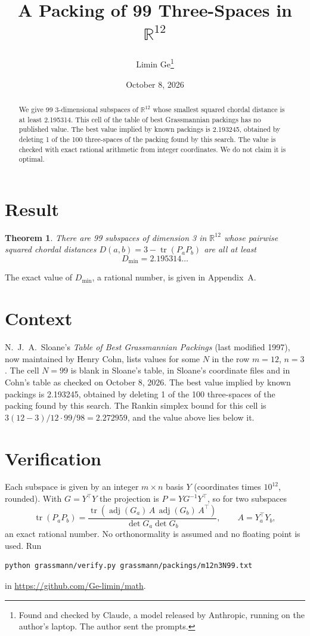 \documentclass[11pt,a4paper]{article}
\title{A Packing of 99 Three-Spaces in $\mathbb{R}^{12}$}
\author{Limin Ge\thanks{Found and checked by Claude, a model released by Anthropic, running on the author's laptop. The author sent the prompts.}}
\date{October 8, 2026}
\newtheorem*{theorem}{Theorem}
\begin{document}
\maketitle
\begin{abstract}
We give 99 3-dimensional subspaces of $\mathbb{R}^{12}$ whose smallest squared chordal distance is at least 2.195314. This cell of the table of best Grassmannian packings has no published value. The best value implied by known packings is 2.193245, obtained by deleting 1 of the 100 three-spaces of the packing found by this search. The value is checked with exact rational arithmetic from integer coordinates. We do not claim it is optimal.
\end{abstract}

\section{Result}
\begin{theorem}
There are 99 subspaces of dimension 3 in $\mathbb{R}^{12}$ whose pairwise squared chordal distances $D(a,b) = 3 - \operatorname{tr}(P_aP_b)$ are all at least
\[ D_{\min} = 2.195314\ldots \]
\end{theorem}
The exact value of $D_{\min}$, a rational number, is given in Appendix~A.


\section{Context}
N.~J.~A.~Sloane's \emph{Table of Best Grassmannian Packings} (last modified 1997), now maintained by Henry Cohn, lists values for some $N$ in the row $m=12$, $n=3$. The cell $N=99$ is blank in Sloane's table, in Sloane's coordinate files and in Cohn's table as checked on October 8, 2026. The best value implied by known packings is 2.193245, obtained by deleting 1 of the 100 three-spaces of the packing found by this search. The Rankin simplex bound for this cell is $3(12-3)/12\cdot 99/98 = 2.272959$, and the value above lies below it.


\section{Verification}
Each subspace is given by an integer $m\times n$ basis $Y$ (coordinates times $10^{12}$, rounded). With $G=Y^\top Y$ the projection is $P=YG^{-1}Y^\top$, so for two subspaces
\[ \operatorname{tr}(P_aP_b)=\frac{\operatorname{tr}(\operatorname{adj}(G_a)\,A\,\operatorname{adj}(G_b)\,A^\top)}{\det G_a\det G_b},\qquad A=Y_a^\top Y_b, \]
an exact rational number. No orthonormality is assumed and no floating point is used. Run
\begin{verbatim}
python grassmann/verify.py grassmann/packings/m12n3N99.txt
\end{verbatim}
in \url{https://github.com/Ge-limin/math}.
\end{document}
